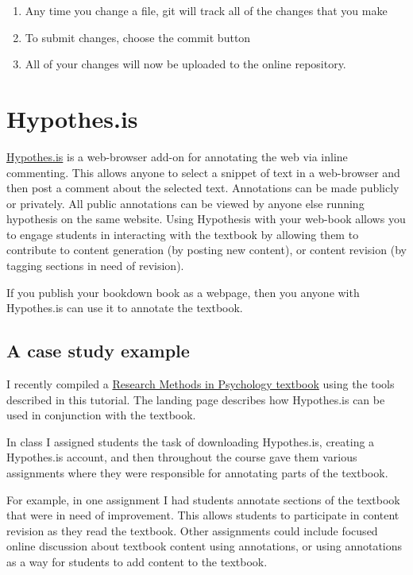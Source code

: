 \documentclass[
]{book}
\providecommand{\tightlist}{%
  \setlength{\itemsep}{0pt}\setlength{\parskip}{0pt}}
\begin{document}
\begin{enumerate}
\def\labelenumi{\arabic{enumi}.}
\tightlist
\item
  Any time you change a file, git will track all of the changes that you make
\item
  To submit changes, choose the commit button
\item
  All of your changes will now be uploaded to the online repository.
\end{enumerate}

\hypertarget{hypothes.is-1}{%
\chapter{Hypothes.is}\label{hypothes.is-1}}

\href{https://web.hypothes.is}{Hypothes.is} is a web-browser add-on for annotating the web via inline commenting. This allows anyone to select a snippet of text in a web-browser and then post a comment about the selected text. Annotations can be made publicly or privately. All public annotations can be viewed by anyone else running hypothesis on the same website. Using Hypothesis with your web-book allows you to engage students in interacting with the textbook by allowing them to contribute to content generation (by posting new content), or content revision (by tagging sections in need of revision).

If you publish your bookdown book as a webpage, then you anyone with Hypothes.is can use it to annotate the textbook.

\hypertarget{a-case-study-example}{%
\section{A case study example}\label{a-case-study-example}}

I recently compiled a \href{http://crumplab.github.io/ResearchMethods/}{Research Methods in Psychology textbook} using the tools described in this tutorial. The landing page describes how Hypothes.is can be used in conjunction with the textbook.

In class I assigned students the task of downloading Hypothes.is, creating a Hypothes.is account, and then throughout the course gave them various assignments where they were responsible for annotating parts of the textbook.

For example, in one assignment I had students annotate sections of the textbook that were in need of improvement. This allows students to participate in content revision as they read the textbook. Other assignments could include focused online discussion about textbook content using annotations, or using annotations as a way for students to add content to the textbook.
\end{document}
